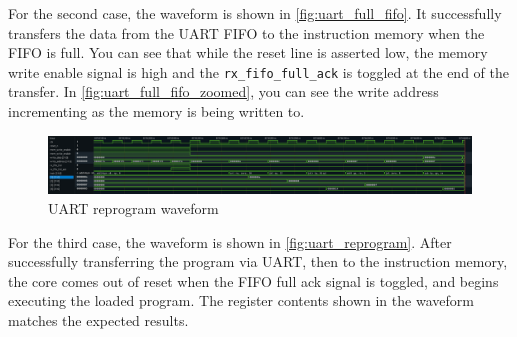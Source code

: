 For the second case, the waveform is shown in \autoref{fig:uart_full_fifo}.
It successfully transfers the data from the UART FIFO to the instruction memory when the FIFO is full.
You can see that while the reset line is asserted low, the memory write enable signal is high and the \texttt{rx\_fifo\_full\_ack} is toggled at the end of the transfer.
In \autoref{fig:uart_full_fifo_zoomed}, you can see the write address incrementing as the memory is being written to.

\begin{figure}[H]
    \centering
    \includegraphics[width=\textwidth]{media/uart_reprogram}
    \caption{UART reprogram waveform}
    \label{fig:uart_reprogram}
\end{figure}

For the third case, the waveform is shown in \autoref{fig:uart_reprogram}.
After successfully transferring the program via UART, then to the instruction memory, the core comes out of reset when the FIFO full ack signal is toggled, and begins executing the loaded program.
The register contents shown in the waveform matches the expected results.